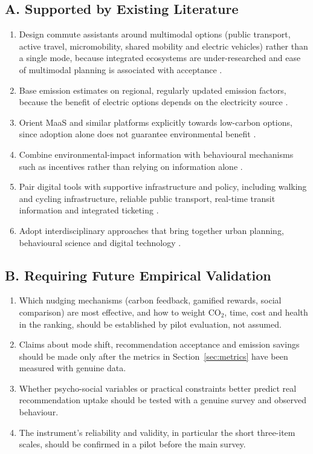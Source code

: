 \documentclass[11pt,a4paper]{article}
\begin{document}
\subsection{A. Supported by Existing Literature}
\begin{enumerate}[leftmargin=*]
\item Design commute assistants around multimodal options (public transport, active travel,
micromobility, shared mobility and electric vehicles) rather than a single mode, because integrated
ecosystems are under-researched and ease of multimodal planning is associated with acceptance
\citep{kashem2025,smith2023}.
\item Base emission estimates on regional, regularly updated emission factors, because the benefit of
electric options depends on the electricity source \citep{ndhlovu2025}.
\item Orient MaaS and similar platforms explicitly towards low-carbon options, since adoption alone
does not guarantee environmental benefit \citep{an2025}.
\item Combine environmental-impact information with behavioural mechanisms such as incentives rather
than relying on information alone \citep{eslami2025,niazi2024}.
\item Pair digital tools with supportive infrastructure and policy, including walking and cycling
infrastructure, reliable public transport, real-time transit information and integrated ticketing
\citep{cui2024,marzolla2025}.
\item Adopt interdisciplinary approaches that bring together urban planning, behavioural science and
digital technology \citep{eslami2025}.
\end{enumerate}

\subsection{B. Requiring Future Empirical Validation}
\begin{enumerate}[leftmargin=*]
\item Which nudging mechanisms (carbon feedback, gamified rewards, social comparison) are most
effective, and how to weight CO$_2$, time, cost and health in the ranking, should be established by
pilot evaluation, not assumed.
\item Claims about mode shift, recommendation acceptance and emission savings should be made only
after the metrics in Section~\ref{sec:metrics} have been measured with genuine data.
\item Whether psycho-social variables or practical constraints better predict real recommendation
uptake should be tested with a genuine survey and observed behaviour.
\item The instrument's reliability and validity, in particular the short three-item scales, should be
confirmed in a pilot before the main survey.
\end{enumerate}
\end{document}
